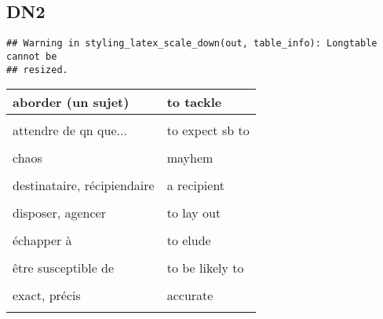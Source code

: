 \documentclass[
  10pt,
]{article}
\begin{document}
\hypertarget{dn2}{%
\subsection{DN2}\label{dn2}}

\begin{verbatim}
## Warning in styling_latex_scale_down(out, table_info): Longtable cannot be
## resized.
\end{verbatim}

\begin{longtable}{ll}
\toprule
aborder (un sujet) & to tackle\\
\midrule
\cellcolor{gray!6}{à haute criminalité} & \cellcolor{gray!6}{crime-ridden}\\

attendre de qn que... & to expect sb to\\

\cellcolor{gray!6}{biaisé, partial} & \cellcolor{gray!6}{biassed}\\

chaos & mayhem\\

\cellcolor{gray!6}{comestible} & \cellcolor{gray!6}{edible}\\

destinataire, récipiendaire & a recipient\\

\cellcolor{gray!6}{diffuser} & \cellcolor{gray!6}{to broadcast}\\

disposer, agencer & to lay out\\

\cellcolor{gray!6}{durer} & \cellcolor{gray!6}{to last}\\

échapper à & to elude\\

\cellcolor{gray!6}{esquisser} & \cellcolor{gray!6}{to sketch}\\

être susceptible de & to be likely to\\

\cellcolor{gray!6}{évident} & \cellcolor{gray!6}{obvious}\\

exact, précis & accurate\\

\cellcolor{gray!6}{fournir (p...)} & \cellcolor{gray!6}{to provide sb with}\\


\end{longtable}
\end{document}

